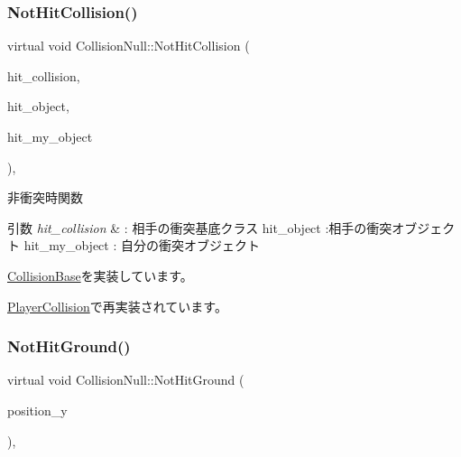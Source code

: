 \subsubsection{\texorpdfstring{Not\+Hit\+Collision()}{NotHitCollision()}}
{\footnotesize\ttfamily virtual void Collision\+Null\+::\+Not\+Hit\+Collision (\begin{DoxyParamCaption}\item[{\mbox{\hyperlink{class_collision_base}{Collision\+Base}} $\ast$}]{hit\+\_\+collision,  }\item[{\mbox{\hyperlink{class_collision_object}{Collision\+Object}} $\ast$}]{hit\+\_\+object,  }\item[{\mbox{\hyperlink{class_collision_object}{Collision\+Object}} $\ast$}]{hit\+\_\+my\+\_\+object }\end{DoxyParamCaption})\hspace{0.3cm}{\ttfamily [inline]}, {\ttfamily [virtual]}}



非衝突時関数 


\begin{DoxyParams}{引数}
{\em hit\+\_\+collision} & \+: 相手の衝突基底クラス hit\+\_\+object \+:相手の衝突オブジェクト hit\+\_\+my\+\_\+object \+: 自分の衝突オブジェクト \\
\hline
\end{DoxyParams}


\mbox{\hyperlink{class_collision_base_a9b64fc5c3f2aac2a05296985ef799fb1}{Collision\+Base}}を実装しています。



\mbox{\hyperlink{class_player_collision_a21b8f825ea142024212ab5fe3f427ab0}{Player\+Collision}}で再実装されています。

\mbox{\label{class_collision_null_ad456a03a3e3d55d8d408b7ed28ce7911}} 
\subsubsection{\texorpdfstring{Not\+Hit\+Ground()}{NotHitGround()}}
{\footnotesize\ttfamily virtual void Collision\+Null\+::\+Not\+Hit\+Ground (\begin{DoxyParamCaption}\item[{float}]{position\+\_\+y }\end{DoxyParamCaption})\hspace{0.3cm}{\ttfamily [inline]}, {\ttfamily [virtual]}}



